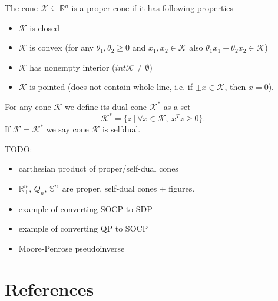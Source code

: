 \documentclass[10pt,oneside]{book}
\theoremstyle{definition}
\begin{document}
\begin{appendix}
\label{defProperCone}
The cone $\mathcal{K}\subseteq \mathbb{R}^n$ is a proper cone if it has following properties
\begin{itemize}
\item $\mathcal{K}$ is closed
\item $\mathcal{K}$ is convex (for any $\theta_1,\theta_2\geq 0$ and $x_1,x_2\in\mathcal{K}$ also $\theta_1x_1 + \theta_2x_2 \in\mathcal{K}$)
\item $\mathcal{K}$ has nonempty interior  ($int \mathcal{K} \neq \emptyset$)
\item $\mathcal{K}$ is pointed (does not contain whole line, i.e. if $\pm x\in \mathcal{K}$, then $x=0$).
\end{itemize}

\label{defDualCone}
For any cone $\mathcal{K}$ we define its dual cone $\mathcal{K}^*$ as a set
\begin{equation}
\mathcal{K}^* = \{z\ |\ \forall x\in\mathcal{K}, \ x^Tz\geq 0\}.
\end{equation}
If  $\mathcal{K} =  \mathcal{K}^*$ we say cone $\mathcal{K}$ is selfdual.

TODO: 
\begin{itemize}
\item carthesian product of proper/self-dual cones
\item $\mathbb{R}^n_+$, $Q_n$, $ \mathbb{S}^n_+$ are proper, self-dual cones + figures.
\item example of converting SOCP to SDP
\item example of converting QP to SOCP
\item Moore-Penrose pseudoinverse

\end{itemize}


\end{appendix}

\chapter*{References}
\end{document}
